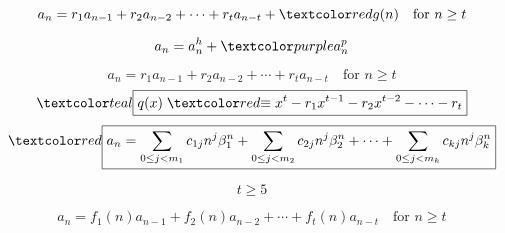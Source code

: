 
\begin{frame}{}
  \begin{center}
    {}
  \end{center}
\end{frame}

\begin{frame}{}
  \[
    a_n = r_1 a_{n-1} + r_2 a_{n-2} + \cdots + r_t a_{n-t} + \red{g(n)} \quad \text{for } n \ge t
  \]

  \vspace{0.50cm}
  \[
    a_n = a_n^{h} + \purple{a_n^{p}}
  \]

  \begin{center}
    {\href{http://mysite.science.uottawa.ca/msajna/MAT2348/non-hom-RR.pdf}
  {}}
  \end{center}
\end{frame}

\begin{frame}{}
  \[
    a_n = r_1 a_{n-1} + r_2 a_{n-2} + \cdots + r_t a_{n-t} \quad \text{for } n \ge t
  \]
  \[
    \teal{\boxed{q(x) \;\red{\equiv}\; x^t - r_1 x^{t-1} - r_2 x^{t-2} - \cdots - r_t}}
  \]
  \[
    \red{\boxed{a_n = \sum_{0 \le j < m_1} c_{1j} n^j \beta_{1}^{n} 
      + \sum_{0 \le j < m_2} c_{2j} n^j \beta_{2}^{n} + \cdots 
      + \sum_{0 \le j < m_k} c_{kj} n^j \beta_{k}^{n}}}
  \]

  \[
    t \ge 5
  \]

  \vspace{0.30cm}
  \begin{center}
    {}
  \end{center}
\end{frame}

\begin{frame}{}
  \[
    a_n = f_1(n) a_{n-1} + f_2(n) a_{n-2} + \cdots + f_t(n) a_{n-t} \quad \text{for } n \ge t
  \]

  \vspace{0.60cm}
  \begin{center}
    {}
  \end{center}
\end{frame}

\begin{frame}{}
\end{frame}

